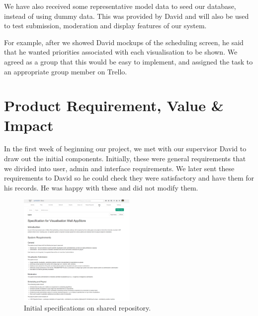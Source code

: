 \documentclass[a4paper]{article}
\begin{document}
We have also received some representative model data to seed our database, 
instead of using dummy data. This was provided by David and will also be 
used to test submission, moderation and display features of our system.

For example, after we showed David mockups of the scheduling screen, he said that 
he wanted priorities associated with each visualisation to be shown. We agreed as a 
group that this would be easy to implement, and assigned the task to an appropriate
group member on Trello. 


\section{Product Requirement, Value \& Impact}
In the first week of beginning our project, we met with our supervisor 
David to draw out the initial components. Initially, these were general
requirements that we divided into user, admin and interface 
requirements. We later sent these requirements to David so he could check
they were satisfactory and have them for his records. He was happy with 
these and did not modify them.



\begin{figure}[H]
  \centering
    \includegraphics[width = 0.5\textwidth]{./evaluation/specs.png}

  \caption{Initial specifications on shared repository.}
  \label{fig:specs}
\end{figure}
\end{document}
